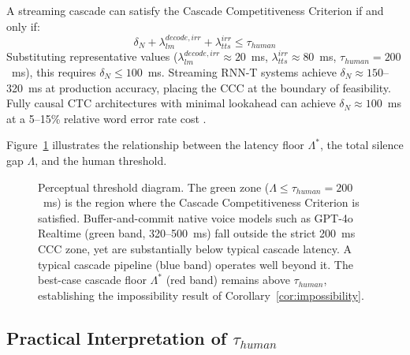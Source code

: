 \begin{corollary}
\label{cor:streaming_ccc}
A streaming cascade can satisfy the Cascade Competitiveness Criterion if and only if:
\begin{equation}
  \delta_N + \lambda_{lm}^{decode,irr} + \lambda_{tts}^{irr} \leq \tau_{human}
\end{equation}
Substituting representative values ($\lambda_{lm}^{decode,irr} \approx 20$~ms,
$\lambda_{tts}^{irr} \approx 80$~ms, $\tau_{human} = 200$~ms), this requires
$\delta_N \leq 100$~ms.
Streaming RNN-T systems \citep{sainath2020streaming} achieve $\delta_N \approx 150$--320~ms
at production accuracy, placing the CCC at the boundary of feasibility.
Fully causal CTC architectures with minimal lookahead can achieve $\delta_N \approx 100$~ms
at a 5--15\% relative word error rate cost \citep{yao2021wenet}.
\end{corollary}

Figure~\ref{fig:perceptual_threshold} illustrates the relationship between
the latency floor $\Lambda^*$, the total silence gap $\Lambda$, and the human threshold.

\begin{figure}[t]
  \centering
  \resizebox{\linewidth}{!}{%
  }
  \caption{Perceptual threshold diagram.
           The green zone ($\Lambda \leq \tau_{human} = 200$~ms) is the region where
           the Cascade Competitiveness Criterion is satisfied.
           Buffer-and-commit native voice models such as GPT-4o Realtime (green band,
           320--500~ms) fall outside the strict 200~ms CCC zone, yet are substantially
           below typical cascade latency.
           A typical cascade pipeline (blue band) operates well beyond it.
           The best-case cascade floor $\Lambda^*$ (red band) remains above
           $\tau_{human}$, establishing the impossibility result of
           Corollary~\ref{cor:impossibility}.}
  \label{fig:perceptual_threshold}
\end{figure}

\subsection{Practical Interpretation of \texorpdfstring{$\tau_{human}$}{tau\_human}}

